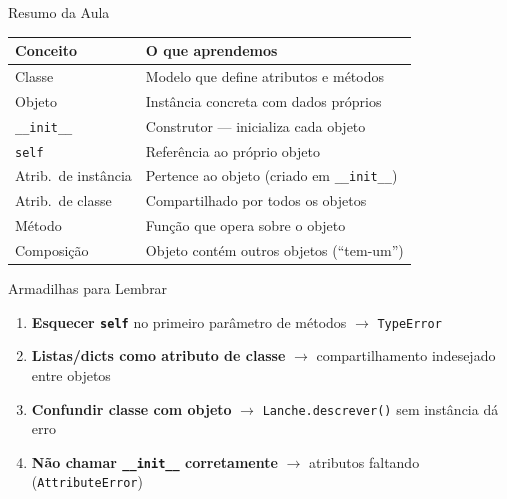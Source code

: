 \documentclass[aspectratio=169]{beamer}
\begin{document}
\begin{frame}{Resumo da Aula}
  \begin{table}
    \centering
    \small
    \begin{tabular}{lp{8cm}}
      \toprule
      \textbf{Conceito} & \textbf{O que aprendemos} \\
      \midrule
      Classe       & Modelo que define atributos e métodos \\
      Objeto       & Instância concreta com dados próprios \\
      \texttt{\_\_init\_\_} & Construtor --- inicializa cada objeto \\
      \texttt{self}  & Referência ao próprio objeto \\
      Atrib.\ de instância & Pertence ao objeto (criado em \texttt{\_\_init\_\_}) \\
      Atrib.\ de classe    & Compartilhado por todos os objetos \\
      Método       & Função que opera sobre o objeto \\
      Composição   & Objeto contém outros objetos (``tem-um'') \\
      \bottomrule
    \end{tabular}
  \end{table}
\end{frame}

\begin{frame}{Armadilhas para Lembrar}
  \begin{enumerate}
    \item \textbf{Esquecer \texttt{self}} no primeiro parâmetro de métodos
          $\rightarrow$ \texttt{TypeError}
    \item \textbf{Listas/dicts como atributo de classe} $\rightarrow$
          compartilhamento indesejado entre objetos
    \item \textbf{Confundir classe com objeto} $\rightarrow$
          \texttt{Lanche.descrever()} sem instância dá erro
    \item \textbf{Não chamar \texttt{\_\_init\_\_} corretamente} $\rightarrow$
          atributos faltando (\texttt{AttributeError})
  \end{enumerate}
\end{frame}
\end{document}
